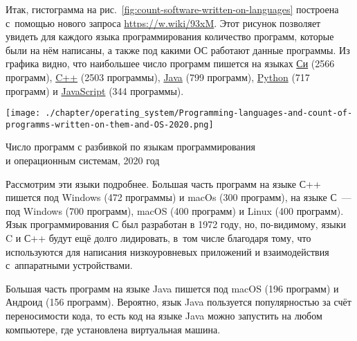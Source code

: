 Итак, гистограмма на рис.~\ref{fig:count-software-written-on-languages} 
построена с~помощью нового запроса \href{https://w.wiki/93xM}
                                 {https://w.wiki/93xM}. 
Этот рисунок 
позволяет увидеть для каждого языка программирования количество программ, 
которые были на нём написаны, а также под какими ОС работают данные программы. 
Из графика видно, что наибольшее число программ пишется на языках \href{https://www.wikidata.org/wiki/Q15777}{Си} (2566 программ), \href{https://www.wikidata.org/wiki/Q2407}{C++} (2503 программы), \href{https://www.wikidata.org/wiki/Q251}{Java} (799 программ), \href{https://www.wikidata.org/wiki/Q28865}{Python} (717 программ) и \href{https://www.wikidata.org/wiki/Q2005}{JavaScript} (344 программы).

\begin{marginfigure}[0\baselineskip]
	\texttt{[image: ./chapter/operating\_system/Programming-languages-and-count-of-programms-written-on-them-and-OS-2020.png]}

    \vspace{-5pt}
    \caption[Число программ с разбивкой по языкам и ОС, 2020 год.]
    {Число программ с разбивкой по языкам программирования\\и операционным системам, 2020 год}
	\label{fig:count-software-written-on-languages}
\end{marginfigure}

Рассмотрим эти языки подробнее. 
Большая часть программ на языке С++ пишется под Windows (472 программы) и macOs (300 программ), 
на языке С~--- под Windows (700 программ), macOS (400 программ) и Linux (400 программ). 
Язык программирования С был разработан в 1972 году, 
но, по-видимому, языки C и С++ будут ещё долго лидировать, 
в~том числе благодаря тому, что используются для написания низкоуровневых приложений 
и взаимодействия с~аппаратными устройствами\autocite{FutureProgrLang2016}.

Большая часть программ на языке Java пишется под macOS (196 программ) и Андроид (156 программ). 
Вероятно, язык Java пользуется популярностью 
за счёт переносимости кода, 
то есть код на языке Java можно запустить на любом компьютере, 
где установлена виртуальная машина. 

